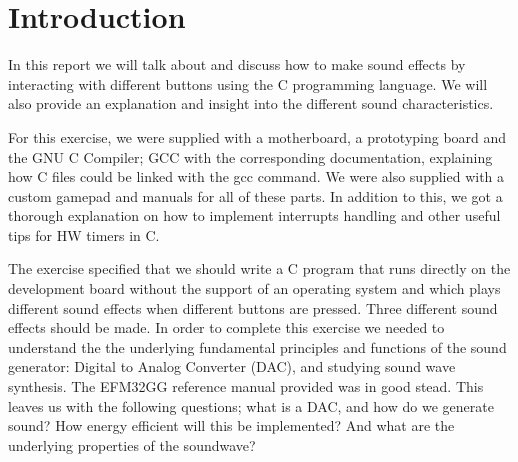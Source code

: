 \chapter{Introduction}

In this report we will talk about and discuss how to make sound effects by interacting with different buttons using the C programming language. We will also provide an explanation and insight into the different sound characteristics.

For this exercise, we were supplied with a motherboard, a prototyping board and the GNU C Compiler; GCC with the corresponding documentation, explaining how C files could be linked with the gcc command.  We were also supplied with a custom gamepad and manuals for all of these parts. In addition to this, we got a thorough explanation on how to implement interrupts handling and other useful tips for HW timers in C. 

The exercise specified that we should write a C program that runs directly on the development board without the support of an operating system and which plays different sound effects when different buttons are pressed. Three different sound effects should be made. In order to complete this exercise we needed to understand the the underlying fundamental principles and functions of the sound generator: Digital to Analog Converter (DAC), and studying sound wave synthesis. The EFM32GG reference manual provided was in good stead. 
This leaves us with the following questions; what is a DAC, and how do we generate sound? How energy efficient will this be implemented? And what are the underlying properties of the soundwave?

